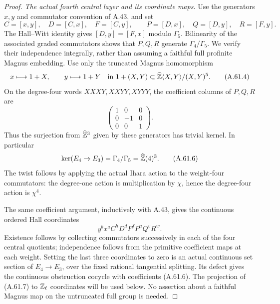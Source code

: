 \begin{proof}
\emph{The actual fourth central layer and its coordinate maps.}
Use the generators $x,y$ and commutator convention of A.43,
and set
\[
 C=[x,y],\quad D=[C,x],\quad F=[C,y],\qquad
 P=[D,x],\quad Q=[D,y],\quad R=[F,y].
 \tag{A.61.3}
\]
The Hall--Witt identity gives $[D,y]=[F,x]$ modulo
$\Gamma_5$.  Bilinearity of the associated graded
commutators shows that $P,Q,R$ generate
$\Gamma_4/\Gamma_5$.
We verify their independence integrally, rather than
assuming a faithful full profinite Magnus embedding.
Use only the truncated Magnus homomorphism
\[
 x\longmapsto1+X,\qquad y\longmapsto1+Y
       \quad\hbox{in }1+(X,Y)
       \subset\widehat{\mathbb Z}\langle X,Y\rangle/(X,Y)^5.
 \tag{A.61.4}
\]
On the degree-four words $XXXY,XXYY,XYYY$, the
coefficient columns of $P,Q,R$ are
\[
                   \begin{pmatrix}1&0&0\\0&-1&0\\0&0&1\end{pmatrix}.
 \tag{A.61.5}
\]
Thus the surjection from $\widehat{\mathbb Z}^3$ given by
these generators has trivial kernel.  In particular
\[
        \ker(E_4\to E_3)=\Gamma_4/\Gamma_5
                              =\widehat{\mathbb Z}(4)^3.
 \tag{A.61.6}
\]
The twist follows by applying the actual Ihara action
to the weight-four commutators: the degree-one action
is multiplication by $\chi$, hence the degree-four
action is $\chi^4$.

The same coefficient argument, inductively with A.43,
gives the continuous ordered Hall coordinates
\[
                 y^b x^a C^h D^d F^f P^uQ^vR^w.
 \tag{A.61.7}
\]
Existence follows by collecting commutators successively
in each of the four central quotients; independence follows
from the primitive coefficient maps at each weight.
Setting the last three coordinates to zero is an actual
continuous set section of $E_4\to E_3$, over the fixed
rational tangential splitting.  Its defect gives the
continuous obstruction cocycle with coefficients (A.61.6).
The projection of (A.61.7) to $\mathbb Z_\ell$ coordinates will
be used below.  No assertion about a faithful Magnus map
on the untruncated full group is needed.


\end{proof}
